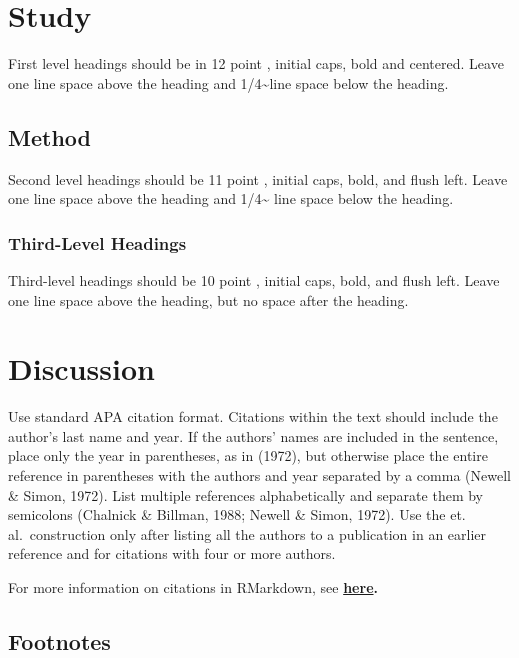 \documentclass[10pt, letterpaper]{article}
\begin{document}
\hypertarget{study}{%
\section{Study}\label{study}}

First level headings should be in 12 point , initial caps, bold and
centered. Leave one line space above the heading and
1/4\textasciitilde line space below the heading.

\hypertarget{method}{%
\subsection{Method}\label{method}}

Second level headings should be 11 point , initial caps, bold, and flush
left. Leave one line space above the heading and 1/4\textasciitilde{}
line space below the heading.

\hypertarget{third-level-headings}{%
\subsubsection{Third-Level Headings}\label{third-level-headings}}

Third-level headings should be 10 point , initial caps, bold, and flush
left. Leave one line space above the heading, but no space after the
heading.

\hypertarget{discussion}{%
\section{Discussion}\label{discussion}}

Use standard APA citation format. Citations within the text should
include the author's last name and year. If the authors' names are
included in the sentence, place only the year in parentheses, as in
(1972), but otherwise place the entire reference in parentheses with the
authors and year separated by a comma (Newell \& Simon, 1972). List
multiple references alphabetically and separate them by semicolons
(Chalnick \& Billman, 1988; Newell \& Simon, 1972). Use the et.
al.~construction only after listing all the authors to a publication in
an earlier reference and for citations with four or more authors.

For more information on citations in RMarkdown, see
\textbf{\href{http://rmarkdown.rstudio.com/authoring_bibliographies_and_citations.html\#citations}{here}.}

\hypertarget{footnotes}{%
\subsection{Footnotes}\label{footnotes}}
\end{document}
